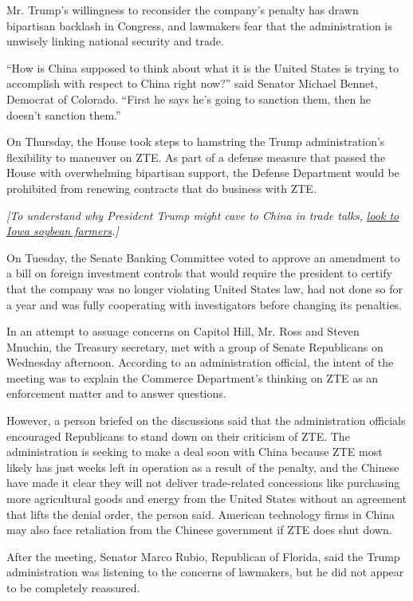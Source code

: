 Mr. Trump's willingness to reconsider the company's penalty has drawn
bipartisan backlash in Congress, and lawmakers fear that the
administration is unwisely linking national security and trade.

``How is China supposed to think about what it is the United States is
trying to accomplish with respect to China right now?'' said Senator
Michael Bennet, Democrat of Colorado. ``First he says he's going to
sanction them, then he doesn't sanction them.''

On Thursday, the House took steps to hamstring the Trump
administration's flexibility to maneuver on ZTE. As part of a defense
measure that passed the House with overwhelming bipartisan support, the
Defense Department would be prohibited from renewing contracts that do
business with ZTE.

\emph{{[}To understand why President Trump might cave to China in trade
talks,}
\href{https://www.nytimes.com/2018/06/07/business/trump-trade-china-iowa-soybeans.html}{\emph{look
to Iowa soybean farmers}}\emph{.{]}}

On Tuesday, the Senate Banking Committee voted to approve an amendment
to a bill on foreign investment controls that would require the
president to certify that the company was no longer violating United
States law, had not done so for a year and was fully cooperating with
investigators before changing its penalties.

In an attempt to assuage concerns on Capitol Hill, Mr. Ross and Steven
Mnuchin, the Treasury secretary, met with a group of Senate Republicans
on Wednesday afternoon. According to an administration official, the
intent of the meeting was to explain the Commerce Department's thinking
on ZTE as an enforcement matter and to answer questions.

However, a person briefed on the discussions said that the
administration officials encouraged Republicans to stand down on their
criticism of ZTE. The administration is seeking to make a deal soon with
China because ZTE most likely has just weeks left in operation as a
result of the penalty, and the Chinese have made it clear they will not
deliver trade-related concessions like purchasing more agricultural
goods and energy from the United States without an agreement that lifts
the denial order, the person said. American technology firms in China
may also face retaliation from the Chinese government if ZTE does shut
down.

After the meeting, Senator Marco Rubio, Republican of Florida, said the
Trump administration was listening to the concerns of lawmakers, but he
did not appear to be completely reassured.

